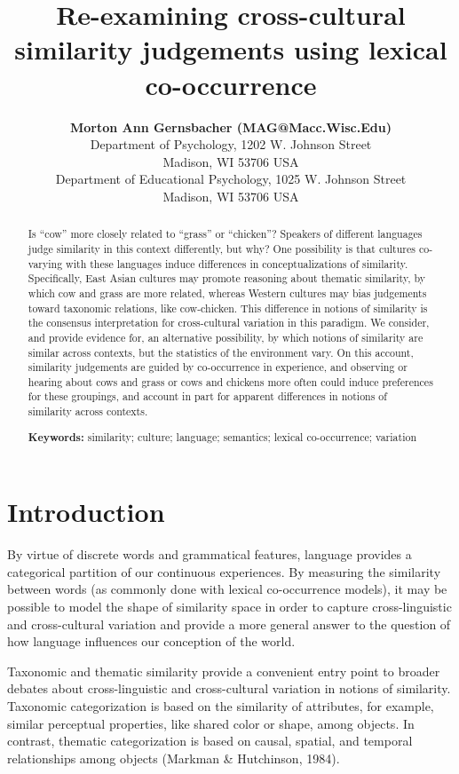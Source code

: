 \documentclass[10pt, letterpaper]{article}
\title{Re-examining cross-cultural similarity judgements using lexical
co-occurrence}
\author{{\large \bf Morton Ann Gernsbacher (MAG@Macc.Wisc.Edu)} \\ Department of Psychology, 1202 W. Johnson Street \\ Madison, WI 53706 USA \AND {\large \bf Sharon J.~Derry (SDJ@Macc.Wisc.Edu)} \\ Department of Educational Psychology, 1025 W. Johnson Street \\ Madison, WI 53706 USA}
\begin{document}
\maketitle

\begin{abstract}
Is ``cow'' more closely related to ``grass'' or ``chicken''? Speakers of
different languages judge similarity in this context differently, but
why? One possibility is that cultures co-varying with these languages
induce differences in conceptualizations of similarity. Specifically,
East Asian cultures may promote reasoning about thematic similarity, by
which cow and grass are more related, whereas Western cultures may bias
judgements toward taxonomic relations, like cow-chicken. This difference
in notions of similarity is the consensus interpretation for
cross-cultural variation in this paradigm. We consider, and provide
evidence for, an alternative possibility, by which notions of similarity
are similar across contexts, but the statistics of the environment vary.
On this account, similarity judgements are guided by co-occurrence in
experience, and observing or hearing about cows and grass or cows and
chickens more often could induce preferences for these groupings, and
account in part for apparent differences in notions of similarity across
contexts.

\textbf{Keywords:}
similarity; culture; language; semantics; lexical co-occurrence;
variation
\end{abstract}

\hypertarget{introduction}{%
\section{Introduction}\label{introduction}}

By virtue of discrete words and grammatical features, language provides
a categorical partition of our continuous experiences. By measuring the
similarity between words (as commonly done with lexical co-occurrence
models), it may be possible to model the shape of similarity space in
order to capture cross-linguistic and cross-cultural variation and
provide a more general answer to the question of how language influences
our conception of the world.

Taxonomic and thematic similarity provide a convenient entry point to
broader debates about cross-linguistic and cross-cultural variation in
notions of similarity. Taxonomic categorization is based on the
similarity of attributes, for example, similar perceptual properties,
like shared color or shape, among objects. In contrast, thematic
categorization is based on causal, spatial, and temporal relationships
among objects (Markman \& Hutchinson, 1984).
\end{document}

